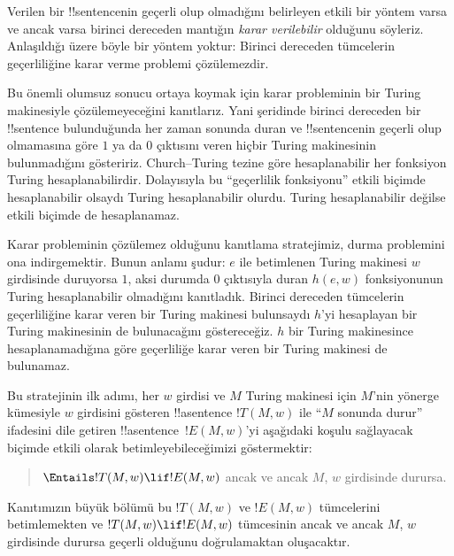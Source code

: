 


Verilen bir !!{sentence}{}nin geçerli olup olmadığını belirleyen etkili bir
yöntem varsa ve ancak varsa birinci dereceden mantığın \emph{karar
verilebilir} olduğunu söyleriz. Anlaşıldığı üzere böyle bir yöntem yoktur:
Birinci dereceden tümcelerin geçerliliğine karar verme problemi çözülemezdir.

Bu önemli olumsuz sonucu ortaya koymak için karar probleminin bir Turing
makinesiyle çözülemeyeceğini kanıtlarız. Yani şeridinde birinci dereceden bir
!!{sentence} bulunduğunda her zaman sonunda duran ve !!{sentence}{}nin geçerli
olup olmamasına göre $1$ ya da $0$ çıktısını veren hiçbir Turing makinesinin
bulunmadığını gösteririz. Church--Turing tezine göre hesaplanabilir her
fonksiyon Turing hesaplanabilirdir. Dolayısıyla bu ``geçerlilik fonksiyonu''
etkili biçimde hesaplanabilir olsaydı Turing hesaplanabilir olurdu. Turing
hesaplanabilir değilse etkili biçimde de hesaplanamaz.

Karar probleminin çözülemez olduğunu kanıtlama stratejimiz, durma problemini
ona indirgemektir. Bunun anlamı şudur: $e$ ile betimlenen Turing makinesi $w$
girdisinde duruyorsa $1$, aksi durumda $0$ çıktısıyla duran $h(e,w)$
fonksiyonunun Turing hesaplanabilir olmadığını kanıtladık. Birinci dereceden
tümcelerin geçerliliğine karar veren bir Turing makinesi bulunsaydı $h$'yi
hesaplayan bir Turing makinesinin de bulunacağını göstereceğiz. $h$ bir
Turing makinesince hesaplanamadığına göre geçerliliğe karar veren bir Turing
makinesi de bulunamaz.

Bu stratejinin ilk adımı, her $w$ girdisi ve $M$ Turing makinesi için $M$'nin
yönerge kümesiyle $w$ girdisini gösteren !!a{sentence} $!T(M,w)$ ile
``$M$ sonunda durur'' ifadesini dile getiren !!a{sentence}~$!E(M,w)$'yi
aşağıdaki koşulu sağlayacak biçimde etkili olarak betimleyebileceğimizi
göstermektir:
\begin{quote}
  $\Entails !T(M, w) \lif !E(M,w)$ ancak ve ancak $M$, $w$ girdisinde durursa.
\end{quote}
Kanıtımızın büyük bölümü bu $!T(M,w)$ ve $!E(M,w)$ tümcelerini betimlemekten
ve $!T(M,w)\lif !E(M,w)$ tümcesinin ancak ve ancak $M$, $w$ girdisinde
durursa geçerli olduğunu doğrulamaktan oluşacaktır.

